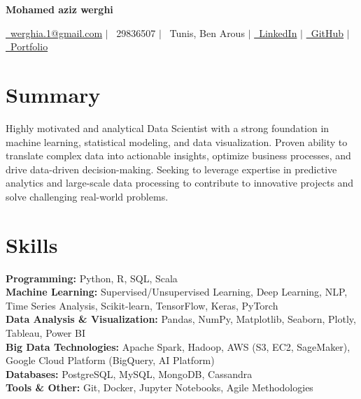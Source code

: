 \documentclass[10pt]{article}
\begin{document}
\RaggedRight %

\begin{center}
    \vspace{-15pt} %
    \color{darkgray}
    \textbf{\Huge Mohamed aziz werghi}
    \vspace{2pt}

    \small
    \href{mailto:werghia.1@gmail.com}{\faEnvelope\ werghia.1@gmail.com} \quad $|$ \quad
    \faPhone\ 29836507 \quad $|$ \quad
    \faMapMarkerAlt\ Tunis, Ben Arous \quad $|$ \quad
    \href{https://gemini.google.com/app/3fa3e864002f45d4}{\faLinkedin\ LinkedIn} \quad $|$ \quad
    \href{https://gemini.google.com/app/3fa3e864002f45d4}{\faGithub\ GitHub} \quad $|$ \quad
    \href{https://gemini.google.com/app/3fa3e864002f45d4}{\faGlobe\ Portfolio}
\end{center}
\vspace{-8pt} %

\section*{Summary}
\vspace{-4pt}
\small
Highly motivated and analytical Data Scientist with a strong foundation in machine learning, statistical modeling, and data visualization. Proven ability to translate complex data into actionable insights, optimize business processes, and drive data-driven decision-making. Seeking to leverage expertise in predictive analytics and large-scale data processing to contribute to innovative projects and solve challenging real-world problems.

\section*{Skills}
\vspace{-4pt}
\small
\textbf{Programming:} Python, R, SQL, Scala \\
\textbf{Machine Learning:} Supervised/Unsupervised Learning, Deep Learning, NLP, Time Series Analysis, Scikit-learn, TensorFlow, Keras, PyTorch \\
\textbf{Data Analysis \& Visualization:} Pandas, NumPy, Matplotlib, Seaborn, Plotly, Tableau, Power BI \\
\textbf{Big Data Technologies:} Apache Spark, Hadoop, AWS (S3, EC2, SageMaker), Google Cloud Platform (BigQuery, AI Platform) \\
\textbf{Databases:} PostgreSQL, MySQL, MongoDB, Cassandra \\
\textbf{Tools \& Other:} Git, Docker, Jupyter Notebooks, Agile Methodologies
\end{document}
